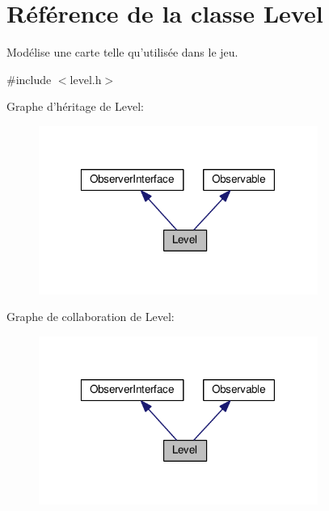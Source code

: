 \hypertarget{classLevel}{\section{Référence de la classe Level}
\label{classLevel}
}


Modélise une carte telle qu'utilisée dans le jeu.  




{\ttfamily \#include $<$level.\+h$>$}



Graphe d'héritage de Level\+:\nopagebreak
\begin{figure}[H]
\begin{center}
\leavevmode
\includegraphics[width=259pt]{dd/d9f/classLevel__inherit__graph}
\end{center}
\end{figure}


Graphe de collaboration de Level\+:\nopagebreak
\begin{figure}[H]
\begin{center}
\leavevmode
\includegraphics[width=259pt]{df/dee/classLevel__coll__graph}
\end{center}
\end{figure}
